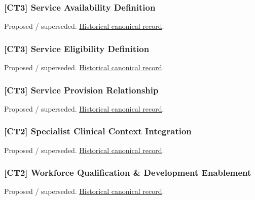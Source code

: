 \subsubsection{[CT3] Service Availability Definition}

\par\label{element:9e5329a42f964199b4b0a87ab1cacc2e}
Proposed / superseded. \href{../../../../continuum/strategy/capability/9e5329a42f964199b4b0a87ab1cacc2e.md}{Historical canonical record}.\par

\subsubsection{[CT3] Service Eligibility Definition}

\par\label{element:8a3f29e5948141e2a3d0c72539759daf}
Proposed / superseded. \href{../../../../continuum/strategy/capability/8a3f29e5948141e2a3d0c72539759daf.md}{Historical canonical record}.\par

\subsubsection{[CT3] Service Provision Relationship}

\par\label{element:718ebe1fa8d44ad9a6632a5932277a8e}
Proposed / superseded. \href{../../../../continuum/strategy/capability/718ebe1fa8d44ad9a6632a5932277a8e.md}{Historical canonical record}.\par

\subsubsection{[CT2] Specialist Clinical Context Integration}

\par\label{element:062802a425d14530b0ce9434c5980d85}
Proposed / superseded. \href{../../../../continuum/strategy/capability/062802a425d14530b0ce9434c5980d85.md}{Historical canonical record}.\par

\subsubsection{[CT2] Workforce Qualification \& Development Enablement}

\par\label{element:d24a1f4c4f674c45a95c317998ff4186}
Proposed / superseded. \href{../../../../continuum/strategy/capability/d24a1f4c4f674c45a95c317998ff4186.md}{Historical canonical record}.\par

